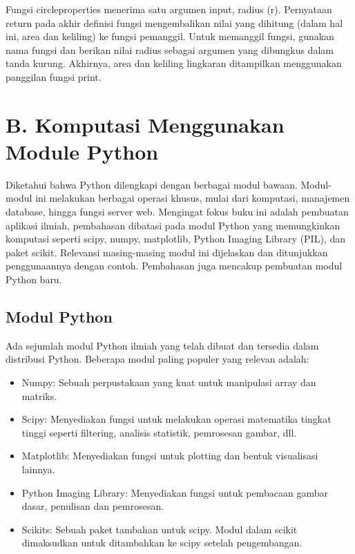 \documentclass[
  letterpaper,
  DIV=11,
  numbers=noendperiod]{scrreprt}
\providecommand{\tightlist}{%
  \setlength{\itemsep}{0pt}\setlength{\parskip}{0pt}}\usepackage{longtable,booktabs,array}
\begin{document}
Fungsi circleproperties menerima satu argumen input, radius (r).
Pernyataan return pada akhir definisi fungsi mengembalikan nilai yang
dihitung (dalam hal ini, area dan keliling) ke fungsi pemanggil. Untuk
memanggil fungsi, gunakan nama fungsi dan berikan nilai radius sebagai
argumen yang dibungkus dalam tanda kurung. Akhirnya, area dan keliling
lingkaran ditampilkan menggunakan panggilan fungsi print.

\hypertarget{b.-komputasi-menggunakan-module-python}{%
\section*{B. Komputasi Menggunakan Module
Python}\label{b.-komputasi-menggunakan-module-python}}


Diketahui bahwa Python dilengkapi dengan berbagai modul bawaan.
Modul-modul ini melakukan berbagai operasi khusus, mulai dari komputasi,
manajemen database, hingga fungsi server web. Mengingat fokus buku ini
adalah pembuatan aplikasi ilmiah, pembahasan dibatasi pada modul Python
yang memungkinkan komputasi seperti scipy, numpy, matplotlib, Python
Imaging Library (PIL), dan paket scikit. Relevansi masing-masing modul
ini dijelaskan dan ditunjukkan penggunaannya dengan contoh. Pembahasan
juga mencakup pembuatan modul Python baru.

\hypertarget{modul-python}{%
\subsection*{Modul Python}\label{modul-python}}

Ada sejumlah modul Python ilmiah yang telah dibuat dan tersedia dalam
distribusi Python. Beberapa modul paling populer yang relevan adalah:

\begin{itemize}
\tightlist
\item
  Numpy: Sebuah perpustakaan yang kuat untuk manipulasi array dan
  matriks.\\
\item
  Scipy: Menyediakan fungsi untuk melakukan operasi matematika tingkat
  tinggi seperti filtering, analisis statistik, pemrosesan gambar,
  dll.\\
\item
  Matplotlib: Menyediakan fungsi untuk plotting dan bentuk visualisasi
  lainnya.\\
\item
  Python Imaging Library: Menyediakan fungsi untuk pembacaan gambar
  dasar, penulisan dan pemrosesan.\\
\item
  Scikits: Sebuah paket tambahan untuk scipy. Modul dalam scikit
  dimaksudkan untuk ditambahkan ke scipy setelah pengembangan.
\end{itemize}
\end{document}
